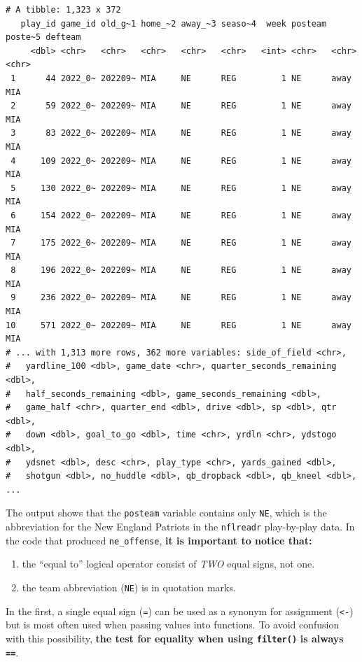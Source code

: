 \documentclass[
  letterpaper,
]{krantz}
\providecommand{\tightlist}{%
  \setlength{\itemsep}{0pt}\setlength{\parskip}{0pt}}\usepackage{longtable,booktabs,array}
\begin{document}
\begin{verbatim}
# A tibble: 1,323 x 372
   play_id game_id old_g~1 home_~2 away_~3 seaso~4  week posteam poste~5 defteam
     <dbl> <chr>   <chr>   <chr>   <chr>   <chr>   <int> <chr>   <chr>   <chr>  
 1      44 2022_0~ 202209~ MIA     NE      REG         1 NE      away    MIA    
 2      59 2022_0~ 202209~ MIA     NE      REG         1 NE      away    MIA    
 3      83 2022_0~ 202209~ MIA     NE      REG         1 NE      away    MIA    
 4     109 2022_0~ 202209~ MIA     NE      REG         1 NE      away    MIA    
 5     130 2022_0~ 202209~ MIA     NE      REG         1 NE      away    MIA    
 6     154 2022_0~ 202209~ MIA     NE      REG         1 NE      away    MIA    
 7     175 2022_0~ 202209~ MIA     NE      REG         1 NE      away    MIA    
 8     196 2022_0~ 202209~ MIA     NE      REG         1 NE      away    MIA    
 9     236 2022_0~ 202209~ MIA     NE      REG         1 NE      away    MIA    
10     571 2022_0~ 202209~ MIA     NE      REG         1 NE      away    MIA    
# ... with 1,313 more rows, 362 more variables: side_of_field <chr>,
#   yardline_100 <dbl>, game_date <chr>, quarter_seconds_remaining <dbl>,
#   half_seconds_remaining <dbl>, game_seconds_remaining <dbl>,
#   game_half <chr>, quarter_end <dbl>, drive <dbl>, sp <dbl>, qtr <dbl>,
#   down <dbl>, goal_to_go <dbl>, time <chr>, yrdln <chr>, ydstogo <dbl>,
#   ydsnet <dbl>, desc <chr>, play_type <chr>, yards_gained <dbl>,
#   shotgun <dbl>, no_huddle <dbl>, qb_dropback <dbl>, qb_kneel <dbl>, ...
\end{verbatim}

The output shows that the \texttt{posteam} variable contains only
\texttt{NE}, which is the abbreviation for the New England Patriots in
the \texttt{nflreadr} play-by-play data. In the code that produced
\texttt{ne\_offense}, \textbf{it is important to notice that:}

\begin{enumerate}
\def\labelenumi{\arabic{enumi}.}
\tightlist
\item
  the ``equal to'' logical operator consist of \emph{TWO} equal signs,
  not one.
\item
  the team abbreviation (\texttt{NE}) is in quotation marks.
\end{enumerate}

In the first, a single equal sign (\texttt{=}) can be used as a synonym
for assignment (\texttt{\textless{}-}) but is most often used when
passing values into functions. To avoid confusion with this possibility,
\textbf{the test for equality when using \texttt{filter()}} \textbf{is
always \texttt{==}}.
\end{document}
